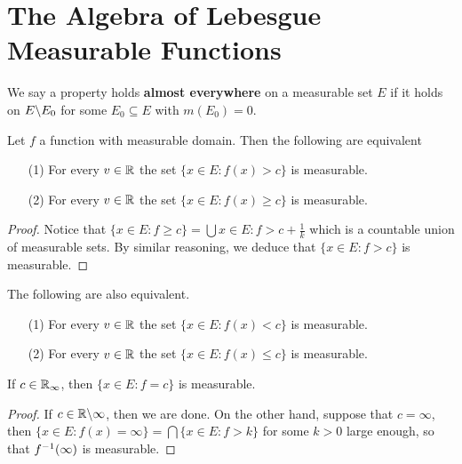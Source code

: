 
\section{The Algebra of Lebesgue Measurable Functions}

\begin{definition}
    We say a property holds \textbf{almost everywhere} on a measurable set $E$
    if it holds on  $E \backslash E_0$ for some $E_0 \subseteq E$ with $m(E_0)=0$.
\end{definition}

\begin{theorem}\label{9.1.1}
    Let $f$ a function with measurable domain. Then the following are equivalent
    \begin{enumerate}
        \item[(1)] For every $v \in \mathbb{R}$ the set  $\{x \in E : f(x)>c\}$ is
            measurable.

        \item[(2)] For every $v \in \mathbb{R}$ the set  $\{x \in E : f(x) \geq c\}$ is
            measurable.
    \end{enumerate}
\end{theorem}
\begin{proof}
    Notice that $\{x \in E : f \geq c\}=\bigcup{x \in E : f>c+\frac{1}{k}}$
    which is a countable union of measurable sets. By similar reasoning, we
    deduce that $\{x \in E: f>c\}$ is measurable.
\end{proof}
\begin{corollary}
    The following are also equivalent.
    \begin{enumerate}
        \item[(1)] For every $v \in \mathbb{R}$ the set  $\{x \in E : f(x)<c\}$ is
            measurable.

        \item[(2)] For every $v \in \mathbb{R}$ the set  $\{x \in E : f(x) \leq c\}$ is
            measurable.
    \end{enumerate}
\end{corollary}
\begin{corollary}
    If $c \in \mathbb{R}_\infty$, then $\{x \in E : f=c\}$ is measurable.
\end{corollary}
\begin{proof}
    If $c \in \mathbb{R} \backslash \infty$, then we are done. On the other hand, suppose
    that $c=\infty$, then  $\{x \in E : f(x)=\infty\}=\bigcap\{x \in E : f>k\}$
    for some $k>0$ large enough, so that  $f^{-1}(\infty)$ is measurable.
\end{proof}

